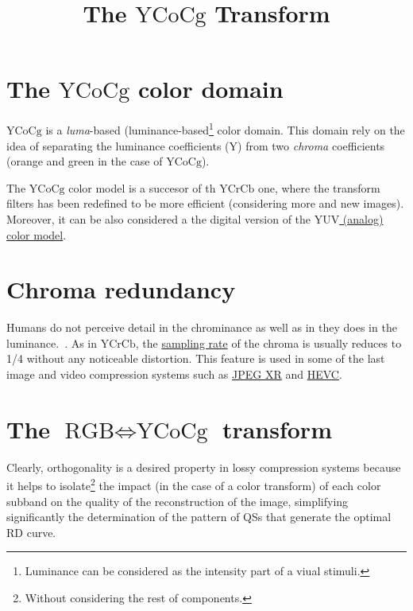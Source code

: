 
\title{The $\text{YCoCg}$ Transform}
\maketitle

\tableofcontents

\section{The $\text{YCoCg}$ color domain}
$\text{YCoCg}$ is a \emph{luma}-based
(luminance-based\footnote{Luminance can be considered as the intensity
part of a viual stimuli.} color domain. This domain rely on the idea
of separating the luminance coefficients (Y) from two \emph{chroma}
coefficients (orange and green in the case of $\text{YCoCg}$).

The $\text{YCoCg}$ color model is a succesor of th $\text{YCrCb}$ one,
where the transform filters has been redefined to be more efficient
(considering more and new images). Moreover, it can be also considered
a the digital version of the
\href{https://en.wikipedia.org/wiki/YUV}{$\text{YUV}$ (analog) color
  model}.

\section{Chroma redundancy}

Humans do not perceive detail in the chrominance as well as in they
does in the
luminance.~\cite{vruiz__visual_redundancy,burger2016digital}. As in
$\text{YCrCb}$, the
\href{https://en.wikipedia.org/wiki/Sampling_(signal_processing)}{sampling
  rate} of the chroma is usually reduces to 1/4 without any noticeable
distortion. This feature is used in some of the last image and video
compression systems such as
\href{https://en.wikipedia.org/wiki/JPEG_XR#Description}{JPEG XR} and
\href{https://en.wikipedia.org/wiki/High_Efficiency_Video_Coding#Video_coding_layer}{HEVC}.

\section{The $\text{RGB} \Leftrightarrow \text{YCoCg}$ transform}

Clearly, orthogonality is a desired property in lossy compression
systems because it helps to isolate\footnote{Without considering the
rest of components.} the impact (in the case of a color transform) of
each color subband on the quality of the reconstruction of the image,
simplifying significantly the determination of the pattern of QSs that
generate the optimal RD curve.

